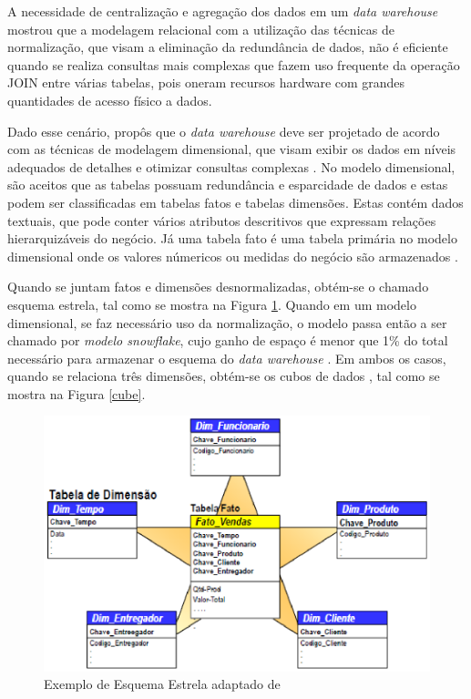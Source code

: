 A necessidade de centralização e agregação dos dados em um \textit{data warehouse} mostrou que a modelagem relacional com a utilização das técnicas de normalização, que visam a eliminação da redundância de dados, não é eficiente quando se realiza consultas mais complexas que fazem uso frequente da operação JOIN entre várias tabelas, pois oneram recursos hardware com grandes quantidades de acesso físico a dados. \cite{Kimball2002}

Dado esse cenário,  propôs que o \textit{data warehouse} deve ser projetado de acordo com as técnicas de modelagem dimensional, que visam exibir os dados em níveis adequados de detalhes e otimizar consultas complexas \cite{valeria2012}. No modelo dimensional, são aceitos que as tabelas possuam redundância e esparcidade de dados e estas podem ser classificadas em tabelas fatos e tabelas dimensões. Estas contém dados textuais, que pode conter vários atributos descritivos que expressam relações hierarquizáveis do negócio. Já uma tabela fato é uma tabela primária no modelo dimensional onde os valores númericos ou medidas do negócio são armazenados \cite{Kimball2002}. 


Quando se juntam fatos e dimensões desnormalizadas, obtém-se o chamado esquema estrela, tal como se mostra na Figura \ref{estrela}. Quando em um modelo dimensional, se faz necessário uso da normalização, o modelo passa então a ser chamado por \textit{modelo snowflake}, cujo ganho de espaço é menor que 1\% do total necessário para armazenar o esquema do \textit{data warehouse} . Em ambos os casos, quando se relaciona três dimensões, obtém-se os cubos de dados \cite{Kimball2002}, tal como se mostra na Figura \ref{cube}.


\begin{figure}[ht!]
\centering
\includegraphics[keepaspectratio=true,scale=0.2]{figuras/star_schema.eps}
\caption{Exemplo de Esquema Estrela adaptado de }
\label{estrela}
\end{figure}
\FloatBarrier



